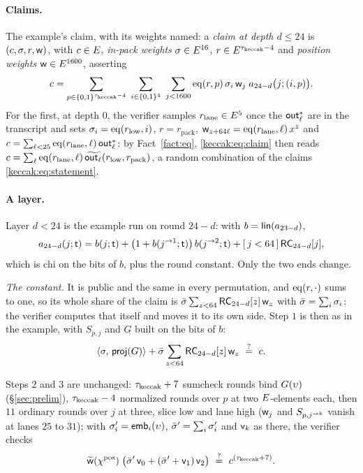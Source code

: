 \paragraph{Claims.}\label{keccak:claims} The example's claim, with its weights named: a \emph{claim at depth $d\le24$} is $(c,\sigma,r,\mathsf{w})$, with $c\in E$, \emph{in-pack weights} $\sigma\in E^{16}$, $r\in E^{\tau_{\mathrm{keccak}}-4}$ and \emph{position weights} $\mathsf{w}\in E^{1600}$, asserting
\begin{equation}\label{keccak:eq:claim}
c=\sum_{p\in\cube{\kbatch-4}}\ \sum_{i\in\cube{4}}\ \sum_{j<1600}\eq(r,p)\,\kw_i\,\kpw_j\;a_{24-d}\bigl(j;(i,p)\bigr).
\end{equation}
For the first, at depth $0$, the verifier samples $r_{\mathrm{lane}}\in E^{5}$ once the $\mathsf{out}^{*}_{\ell}$ are in the transcript and sets $\sigma_i=\operatorname{eq}(r_{\mathrm{low}},i)$, $r=r_{\mathrm{pack}}$, $\mathsf{w}_{z+64\ell}=\operatorname{eq}(r_{\mathrm{lane}},\ell)\,x^{z}$ and $c=\sum_{\ell<25}\operatorname{eq}(r_{\mathrm{lane}},\ell)\,\mathsf{out}^{*}_{\ell}$: by Fact~\ref{fact:eq}, \eqref{keccak:eq:claim} then reads $c=\sum_\ell\operatorname{eq}(r_{\mathrm{lane}},\ell)\,\widetilde{\mathsf{out}_{\ell}}(r_{\mathrm{low}},r_{\mathrm{pack}})$, a random combination of the claims \eqref{keccak:eq:statement}.

\paragraph{A layer.}\label{keccak:layer} Layer $d<24$ is the example run on round $24-d$: with $b=\mathsf{lin}(a_{23-d})$,
\begin{equation}\label{keccak:eq:chi}
a_{24-d}(j;\mathsf{t})=b(j;\mathsf{t})+\bigl(1+b(j^{\rightarrow 1};\mathsf{t})\bigr)\,b(j^{\rightarrow 2};\mathsf{t})+[\,j<64\,]\,\mathsf{RC}_{24-d}[j],
\end{equation}
which is chi on the bits of $b$, plus the round constant. Only the two ends change.

\emph{The constant.} It is public and the same in every permutation, and $\operatorname{eq}(r,\cdot)$ sums to one, so its whole share of the claim is $\bar{\sigma}\sum_{z<64}\mathsf{RC}_{24-d}[z]\,\mathsf{w}_z$ with $\bar{\sigma}=\sum_i\sigma_i$: the verifier computes that itself and moves it to its own side. Step $1$ is then as in the example, with $S_{p,j}$ and $G$ built on the bits of $b$:
\begin{equation}\label{keccak:eq:projection}
\inner{\kw}{\kproj(G)}+\kwsum\sum_{z<64}\krc_{24-d}[z]\,\kpw_z\ \qeq\ c.
\end{equation}

Steps $2$ and $3$ are unchanged: $\tau_{\mathrm{keccak}}+7$ sumcheck rounds bind $G(\upsilon)$ (\S\ref{sec:prelim}), $\tau_{\mathrm{keccak}}-4$ normalized rounds over $p$ at two $E$-elements each, then $11$ ordinary rounds over $j$ at three, slice low and lane high ($\mathsf{w}_j$ and $S_{p,j^{\rightarrow k}}$ vanish at lanes $25$ to $31$); with $\sigma'_i=\mathsf{emb}_i(\upsilon)$, $\bar{\sigma}'=\sum_i\sigma'_i$ and $\mathsf{v}_k$ as there, the verifier checks
\begin{equation}\label{keccak:eq:terminal}
\mle{\kpw}(\fc^{\mathrm{pos}})\;\bigl(\kwsum'\,\kev_0+(\kwsum'+\kev_1)\,\kev_2\bigr)\ \qeq\ \rc{\kbatch+7}.
\end{equation}

